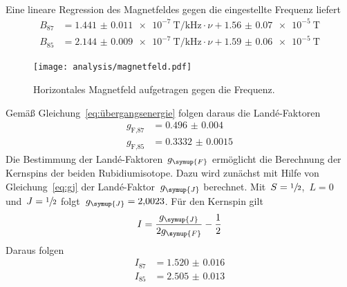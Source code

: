 %
\\Eine lineare Regression des Magnetfeldes gegen die eingestellte Frequenz liefert
%
\begin{align}
  B_{87}&=\SI{1.441(11)e-7}{\tesla\per\kilo\hertz}\cdot\nu
  +\SI{1.56(7)e-5}{\tesla} \\
  B_{85}&=\SI{2.144(9)e-7}{\tesla\per\kilo\hertz}\cdot\nu
  +\SI{1.59(6)e-5}{\tesla}
\end{align}
%
\begin{figure}[htb]
  \centering
  \texttt{[image: analysis/magnetfeld.pdf]}
  \caption{Horizontales Magnetfeld aufgetragen gegen die Frequenz.}
  \label{fig:magnetfeld}
\end{figure}
%
Gemäß Gleichung~\eqref{eq:übergangsenergie} folgen daraus die Landé-Faktoren
%
\begin{align}
  g_{\text{F,87}}&=\num{0.496(4)} \\
  g_{\text{F,85}}&=\num{0.3332(15)}
\end{align}
%
Die Bestimmung der Landé-Faktoren~$g_{\symup{F}}$ ermöglicht die Berechnung der
Kernspins der beiden Rubidiumisotope. Dazu wird zunächst mit Hilfe von
Gleichung~\eqref{eq:gj} der Landé-Faktor~$g_{\symup{J}}$ berechnet.
Mit~$S=\sfrac{1}{2}$,~$L=0$ und~$J=\sfrac{1}{2}$
folgt~$g_{\symup{J}}=\num{2.0023}$. Für den Kernspin gilt
%
\begin{equation*}
  I=\frac{g_{\symup{J}}}{2g_{\symup{F}}}-\frac{1}{2}
\end{equation*}
%
Daraus folgen
%
\begin{align}
  I_{87}&=\num{1.520(16)} \\
  I_{85}&=\num{2.505(13)}
\end{align}

